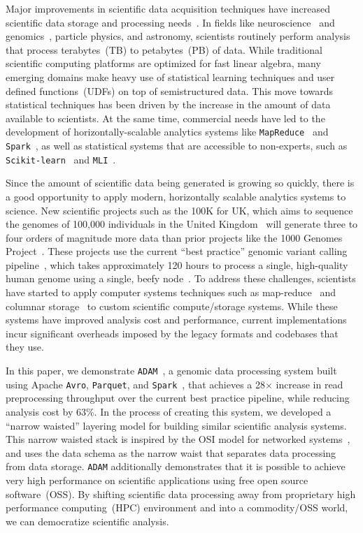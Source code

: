 \documentclass{sig-alternate}
\begin{document}
Major improvements in scientific data acquisition techniques have increased scientific data storage and
processing \linebreak needs~\cite{cunningham14, schadt10}. In fields like
neuroscience~\cite{freeman14} and \linebreak genomics~\cite{stein10}, particle physics, and astronomy,
scientists routinely perform analysis that process terabytes~(TB) to \linebreak petabytes~(PB) of data.
While traditional scientific computing platforms are optimized for fast linear algebra, many emerging
domains make heavy use of statistical learning techniques and user defined functions~(UDFs) on top of
semistructured data. This move towards statistical techniques has been driven by the increase in the
amount of data available to scientists. At the same time, commercial needs have led to the development of
horizontally-scalable analytics systems like \texttt{MapReduce}~\cite{dean04, dean08} and
\texttt{Spark}~\cite{zaharia10}, as well as statistical systems that are accessible to non-experts, such as
\texttt{Scikit-learn}~\cite{pedregosa11} and \texttt{MLI}~\cite{sparks13}.

Since the amount of scientific data being generated is growing so quickly, there is a good opportunity to apply
modern, horizontally scalable analytics systems to science. New scientific
projects such as the 100K for UK, which aims to sequence the genomes of 100,000 individuals in the
United Kingdom~\cite{uk100k} will generate three to four orders of magnitude more data than
prior projects like the 1000 Genomes Project~\cite{siva08}. These projects use the current ``best
practice'' genomic variant calling pipeline~\cite{auwera13}, which takes approximately 120 hours to
process a single, high-quality human genome using a single, beefy node~\cite{talwalkar14}. To address
these challenges, scientists have started to apply computer systems techniques such as
map-reduce~\cite{langmead09, mckenna10, schatz09} and columnar storage~\cite{fritz11} to custom
scientific compute/storage systems. While these systems have improved analysis cost and performance,
current implementations incur significant overheads imposed by the legacy formats and
codebases that they use.

In this paper, we demonstrate \texttt{ADAM}~\cite{massie13}, a genomic data processing system built using Apache
\texttt{Avro}, \texttt{Parquet}, and \texttt{Spark}~\cite{avro, parquet, zaharia10}, that achieves a 28$\times$
increase in read preprocessing throughput over the current best
practice pipeline, while reducing analysis cost by 63\%. In the process of creating this
system, we developed a ``narrow waisted'' layering model for building similar scientific analysis systems.
This narrow waisted stack is inspired by the OSI model for networked systems~\cite{zimmermann80}, and
uses the data schema as the narrow waist that separates data processing from data storage. \texttt{ADAM} additionally
demonstrates that it is possible to achieve very high performance on scientific applications using free open source
software~(OSS). By shifting scientific data processing away from proprietary high performance computing~(HPC)
environment and into a commodity/OSS world, we can democratize scientific analysis.
\end{document}
